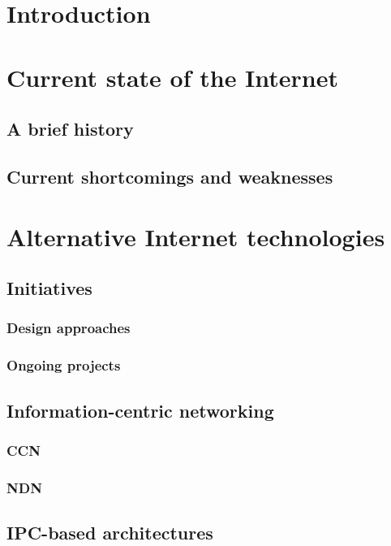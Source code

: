 
\newcommand{\todo}[1]{\textcolor{red}{TODO\:} \textcolor{gray}{#1}}

\chapter{Introduction}\label{introduction}
    
\chapter{Current state of the Internet}\label{state}
	\section{A brief history}
	\section{Current shortcomings and weaknesses}

\chapter{Alternative Internet technologies}\label{alternatives}
	\section{Initiatives}
		\subsection{Design approaches}	
		\subsection{Ongoing projects}
	\section{Information-centric networking}
		\subsection{CCN}
		\subsection{NDN}
	\section{IPC-based architectures}
